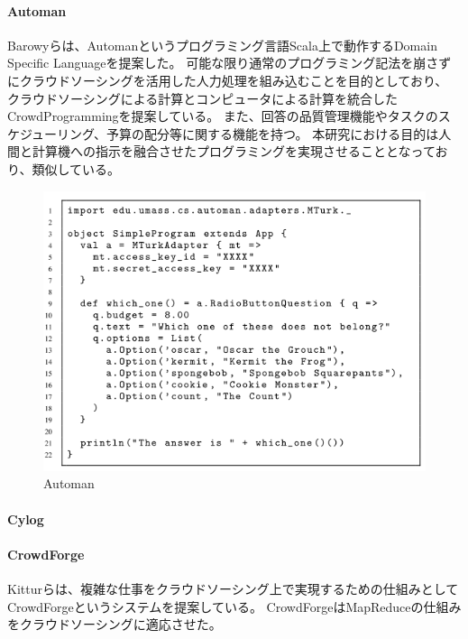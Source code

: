 \paragraph{Automan}\label{automan}

\mbox{}

Barowyらは、Automanというプログラミング言語Scala上で動作するDomain
Specific Languageを提案した\cite{automan}。
可能な限り通常のプログラミング記法を崩さずにクラウドソーシングを活用した人力処理を組み込むことを目的としており、
クラウドソーシングによる計算とコンピュータによる計算を統合したCrowdProgrammingを提案している。
また、回答の品質管理機能やタスクのスケジューリング、予算の配分等に関する機能を持つ。
本研究における目的は人間と計算機への指示を融合させたプログラミングを実現させることとなっており、類似している。

\begin{figure}[htbp]
  \begin{center}
  \includegraphics[width=.6\linewidth,bb=0 0 552 404]{images/automan.png}
  \end{center}
  \caption{Automan}
  \label{fig:automan}
\end{figure}

\paragraph{Cylog}\label{cylog}

\mbox{}

\cite{cylog}

\paragraph{CrowdForge}\label{crowdforge}

\mbox{}

Kitturら\cite{crowdforge}は、複雑な仕事をクラウドソーシング上で実現するための仕組みとして
CrowdForgeというシステムを提案している。
CrowdForgeはMapReduceの仕組みをクラウドソーシングに適応させた。

